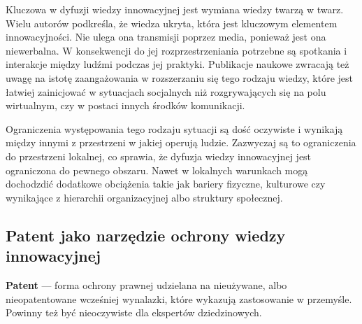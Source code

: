Kluczowa w dyfuzji wiedzy innowacyjnej jest wymiana wiedzy
twarzą w twarz. Wielu autorów podkreśla, że wiedza ukryta,
która jest kluczowym elementem innowacyjności. Nie ulega
ona transmisji poprzez media, ponieważ jest ona niewerbalna.
W konsekwencji do jej rozprzestrzeniania potrzebne są spotkania
i interakcje między ludźmi podczas jej praktyki. Publikacje
naukowe zwracają też uwagę na istotę zaangażowania w rozszerzaniu
się tego rodzaju wiedzy, które jest łatwiej zainicjować w
sytuacjach socjalnych niż rozgrywających się na polu wirtualnym,
czy w postaci innych środków komunikacji.

Ograniczenia występowania tego rodzaju sytuacji są dość oczywiste i
wynikają między innymi z przestrzeni w jakiej operują ludzie.
Zazwyczaj są to ograniczenia do przestrzeni lokalnej, co sprawia,
że dyfuzja wiedzy innowacyjnej jest ograniczona do pewnego obszaru.
Nawet w lokalnych warunkach mogą dochodzdić dodatkowe obciążenia
takie jak bariery fizyczne, kulturowe czy wynikające z hierarchii
organizacyjnej albo struktury społecznej.


\subsection{Patent jako narzędzie ochrony wiedzy innowacyjnej}

\begin{acronym}
\end{acronym}

\begin{defi}
\textbf{Patent} --- forma ochrony prawnej udzielana na nieużywane, 
albo nieopatentowane wcześniej wynalazki, które wykazują 
zastosowanie w przemyśle. Powinny też być nieoczywiste dla 
ekspertów dziedzinowych.
\end{defi}

